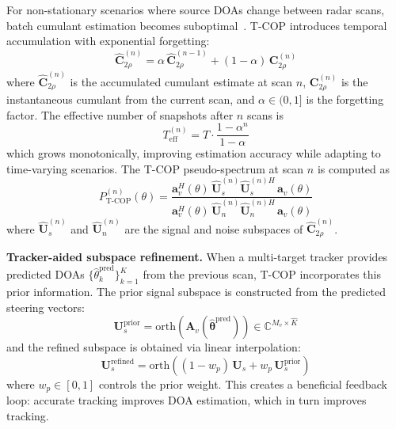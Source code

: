 \documentclass[journal]{IEEEtran}
\newcommand{\vect}[1]{\boldsymbol{#1}}
\newcommand{\mat}[1]{\mathbf{#1}}
\newcommand{\C}{\mathbb{C}}
\begin{document}
For non-stationary scenarios where source DOAs change between radar scans, batch cumulant estimation becomes suboptimal~\cite{tufts1982estimation}. T-COP introduces temporal accumulation with exponential forgetting:
\begin{equation}
\hat{\mat{C}}_{2\rho}^{(n)} = \alpha\,\hat{\mat{C}}_{2\rho}^{(n-1)} + (1-\alpha)\,\mat{C}_{2\rho}^{(n)}
\label{eq:tcop_accumulation}
\end{equation}
where $\hat{\mat{C}}_{2\rho}^{(n)}$ is the accumulated cumulant estimate at scan $n$, $\mat{C}_{2\rho}^{(n)}$ is the instantaneous cumulant from the current scan, and $\alpha \in (0, 1]$ is the forgetting factor. The effective number of snapshots after $n$ scans is
\begin{equation}
T_{\mathrm{eff}}^{(n)} = T \cdot \frac{1 - \alpha^n}{1 - \alpha}
\label{eq:tcop_teff}
\end{equation}
which grows monotonically, improving estimation accuracy while adapting to time-varying scenarios. The T-COP pseudo-spectrum at scan $n$ is computed as
\begin{equation}
P_{\mathrm{T\text{-}COP}}^{(n)}(\theta) = \frac{\mat{a}_v^H(\theta)\,\hat{\mat{U}}_s^{(n)}\hat{\mat{U}}_s^{(n)H}\,\mat{a}_v(\theta)}{\mat{a}_v^H(\theta)\,\hat{\mat{U}}_n^{(n)}\hat{\mat{U}}_n^{(n)H}\,\mat{a}_v(\theta)}
\label{eq:tcop_spectrum}
\end{equation}
where $\hat{\mat{U}}_s^{(n)}$ and $\hat{\mat{U}}_n^{(n)}$ are the signal and noise subspaces of $\hat{\mat{C}}_{2\rho}^{(n)}$.

\textbf{Tracker-aided subspace refinement.}
When a multi-target tracker provides predicted DOAs $\{\hat{\theta}_k^{\mathrm{pred}}\}_{k=1}^{\hat{K}}$ from the previous scan, T-COP incorporates this prior information. The prior signal subspace is constructed from the predicted steering vectors:
\begin{equation}
\mat{U}_s^{\mathrm{prior}} = \mathrm{orth}\!\left(\mat{A}_v(\hat{\vect{\theta}}^{\mathrm{pred}})\right) \in \C^{M_v \times \hat{K}}
\label{eq:tcop_prior_subspace}
\end{equation}
and the refined subspace is obtained via linear interpolation:
\begin{equation}
\mat{U}_s^{\mathrm{refined}} = \mathrm{orth}\!\left((1 - w_p)\,\mat{U}_s + w_p\,\mat{U}_s^{\mathrm{prior}}\right)
\label{eq:tcop_prior}
\end{equation}
where $w_p \in [0, 1]$ controls the prior weight. This creates a beneficial feedback loop: accurate tracking improves DOA estimation, which in turn improves tracking.
\end{document}
